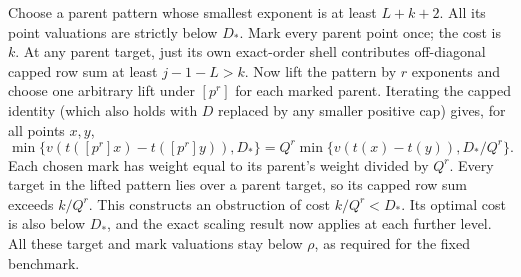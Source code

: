 Choose a parent pattern whose smallest exponent is at least $L+k+2$. All its point valuations are strictly below $D_*$. Mark every parent point once; the cost is $k$. At any parent target, just its own exact-order shell contributes off-diagonal capped row sum at least $j-1-L>k$. Now lift the pattern by $r$ exponents and choose one arbitrary lift under $[p^r]$ for each marked parent. Iterating the capped identity (which also holds with $D$ replaced by any smaller positive cap) gives, for all points $x,y$,
\[
 \min\{v(t([p^r]x)-t([p^r]y)),D_*\}
 =Q^r\min\{v(t(x)-t(y)),D_*/Q^r\}.
\]
Each chosen mark has weight equal to its parent's weight divided by $Q^r$. Every target in the lifted pattern lies over a parent target, so its capped row sum exceeds $k/Q^r$. This constructs an obstruction of cost $k/Q^r<D_*$. Its optimal cost is also below $D_*$, and the exact scaling result now applies at each further level. All these target and mark valuations stay below $\rho$, as required for the fixed benchmark.
